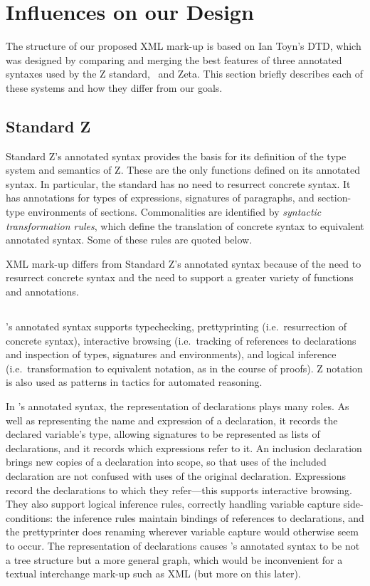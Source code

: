 \documentclass{llncs}  %
\newcommand{\Zeta}{Zeta}
\begin{document}
\section{Influences on our Design}

The structure of our proposed XML mark-up is based on Ian Toyn's DTD,
which was designed by comparing and merging the best features
of three annotated syntaxes used by the Z standard, \CADiZ\ and \Zeta.
This section briefly describes each of these systems and how they
differ from our goals.

\subsection{Standard Z}

Standard Z's annotated syntax provides the basis for its definition
of the type system and semantics of Z.
These are the only functions defined on its annotated syntax.
In particular, the standard has no need to resurrect concrete syntax.
It has annotations for types of expressions,
signatures of paragraphs, and section-type environments of sections.
Commonalities are identified by \textit{syntactic transformation rules},
which define the translation of concrete syntax to equivalent annotated syntax.
Some of these rules are quoted below.

XML mark-up differs from Standard Z's annotated syntax
because of the need to resurrect concrete syntax
and the need to support a greater variety of functions and annotations.

\subsection{\CADiZ}

\CADiZ's annotated syntax supports typechecking,
prettyprinting (i.e.\ resurrection of concrete syntax),
interactive browsing (i.e.\ tracking of references to declarations
and inspection of types, signatures and environments),
and logical inference (i.e.\ transformation to equivalent notation,
as in the course of proofs).
Z notation is also used as patterns in tactics for automated reasoning.

In \CADiZ's annotated syntax,
the representation of declarations plays many roles.
As well as representing the name and expression of a declaration,
it records the declared variable's type,
allowing signatures to be represented as lists of declarations,
and it records which expressions refer to it.
An inclusion declaration brings new copies of a declaration into scope,
so that uses of the included declaration are not
confused with uses of the original declaration.
Expressions record the declarations to which they refer---this
supports interactive browsing.
They also support logical inference rules, correctly handling
variable capture side-conditions:
the inference rules maintain bindings of references to declarations,
and the prettyprinter does renaming
wherever variable capture would otherwise seem to occur.
The representation of declarations causes \CADiZ's annotated syntax
to be not a tree structure but a more general graph,
which would be inconvenient for a textual interchange mark-up such as XML
(but more on this later).
\end{document}
